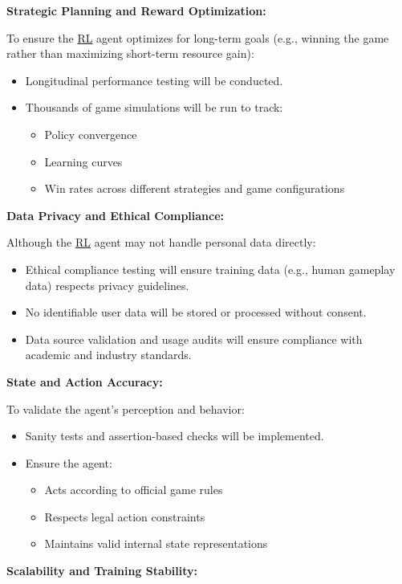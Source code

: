 \documentclass{article}
\newcommand{\RL}{\href{https://www.ibm.com/think/topics/reinforcement-learning}{RL}}
\begin{document}
\noindent\textbf{Strategic Planning and Reward Optimization:}

To ensure the \RL{} agent optimizes for long-term goals (e.g., winning the game rather than maximizing short-term resource gain):
\begin{itemize}
    \item Longitudinal performance testing will be conducted.
    \item Thousands of game simulations will be run to track:
    \begin{itemize}
        \item Policy convergence
        \item Learning curves
        \item Win rates across different strategies and game configurations
    \end{itemize}
\end{itemize}

\noindent\textbf{Data Privacy and Ethical Compliance:}

Although the \RL{} agent may not handle personal data directly:
\begin{itemize}
    \item Ethical compliance testing will ensure training data (e.g., human gameplay data) respects privacy guidelines.
    \item No identifiable user data will be stored or processed without consent.
    \item Data source validation and usage audits will ensure compliance with academic and industry standards.
\end{itemize}

\noindent\textbf{State and Action Accuracy:}

To validate the agent’s perception and behavior:
\begin{itemize}
    \item Sanity tests and assertion-based checks will be implemented.
    \item Ensure the agent:
    \begin{itemize}
        \item Acts according to official game rules
        \item Respects legal action constraints
        \item Maintains valid internal state representations
    \end{itemize}
\end{itemize}

\noindent\textbf{Scalability and Training Stability:}
\end{document}
